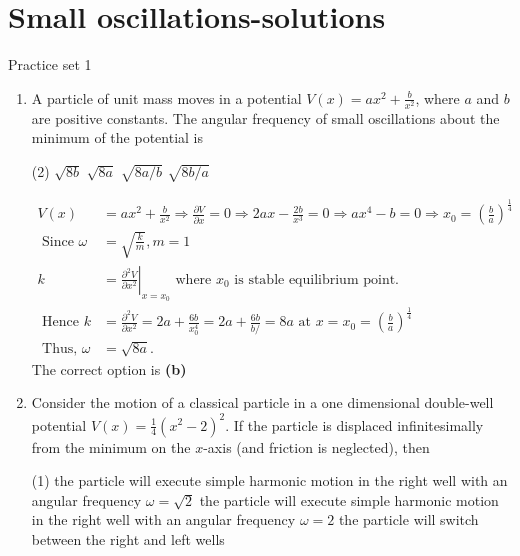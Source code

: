 \chapter{Small oscillations-solutions}
\begin{abox}
	Practice set 1
\end{abox}
\begin{enumerate}
		\item  A particle of unit mass moves in a potential $V(x)=a x^{2}+\frac{b}{x^{2}}$, where $a$ and $b$ are positive constants. The angular frequency of small oscillations about the minimum of the potential is
		{}
	\begin{tasks}(2)
		\task[\textbf{A.}] $\sqrt{8 b}$
		\task[\textbf{B.}]$\sqrt{8 a}$
		\task[\textbf{C.}] $\sqrt{8 a / b}$
		\task[\textbf{D.}]$\sqrt{8 b / a}$
	\end{tasks}
	\begin{answer}
		\begin{align*}
		V(x)&=a x^{2}+\frac{b}{x^{2}} \Rightarrow \frac{\partial V}{\partial x}=0 \Rightarrow 2 a x-\frac{2 b}{x^{3}}=0 \Rightarrow a x^{4}-b=0 \Rightarrow x_{0}=\left(\frac{b}{a}\right)^{\frac{1}{4}}\\
		\text { Since } \omega&=\sqrt{\frac{k}{m}}, m=1\\
		k&=\left.\frac{\partial^{2} V}{\partial x^{2}}\right|_{x=x_{0}} \text { where } x_{0} \text { is stable equilibrium point. }\\
		\text { Hence } k&=\frac{\partial^{2} V}{\partial x^{2}}=2 a+\frac{6 b}{x_{0}^{4}}=2 a+\frac{6 b}{b /}=8 a \text { at } x=x_{0}=\left(\frac{b}{a}\right)^{\frac{1}{4}}\\
		\text { Thus, } \omega&=\sqrt{8 a} \text {. }
		\end{align*}
		The correct option is \textbf{(b)}
	\end{answer}
		\item Consider the motion of a classical particle in a one dimensional double-well potential $V(x)=\frac{1}{4}\left(x^{2}-2\right)^{2} .$ If the particle is displaced infinitesimally from the minimum on the $x$-axis (and friction is neglected), then
		{}
	\begin{tasks}(1)
		\task[\textbf{A.}] the particle will execute simple harmonic motion in the right well with an angular frequency $\omega=\sqrt{2}$
		\task[\textbf{B.}]the particle will execute simple harmonic motion in the right well with an angular frequency $\omega=2$
		\task[\textbf{C.}]the particle will switch between the right and left wells

\end{tasks}
\end{enumerate}
